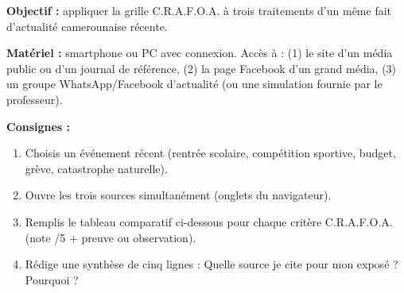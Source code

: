 \documentclass[11pt]{article}
\begin{document}
\begin{experience}
\textbf{Objectif :} appliquer la grille C.R.A.F.O.A. à trois traitements d'un même fait d'actualité camerounaise récente.

\textbf{Matériel :} smartphone ou PC avec connexion. Accès à : (1) le site d'un média public ou d'un journal de référence, (2) la page Facebook d'un grand média, (3) un groupe WhatsApp/Facebook d'actualité (ou une simulation fournie par le professeur).

\textbf{Consignes :}
\begin{enumerate}
    \item Choisis un événement récent (rentrée scolaire, compétition sportive, budget, grève, catastrophe naturelle).
    \item Ouvre les trois sources simultanément (onglets du navigateur).
    \item Remplis le tableau comparatif ci-dessous pour chaque critère C.R.A.F.O.A. (note /5 + preuve ou observation).
    \item Rédige une synthèse de cinq lignes : \og{} Quelle source je cite pour mon exposé ? Pourquoi ? \fg{}
\end{enumerate}


\end{experience}
\end{document}
